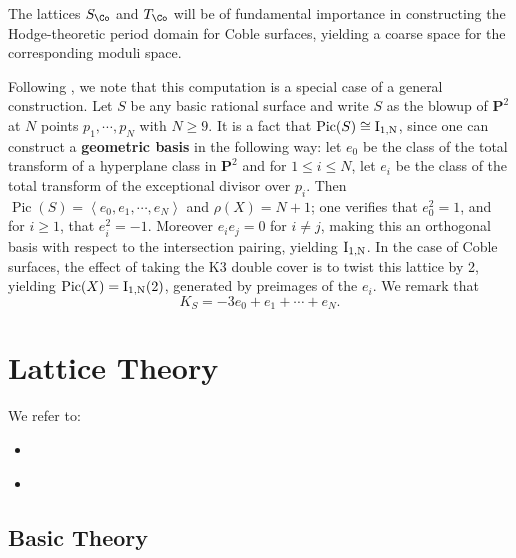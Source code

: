 \documentclass{amsart}
\providecommand{\tightlist}{%
  \setlength{\itemsep}{0pt}\setlength{\parskip}{0pt}}
\begin{document}
\begin{remark}
The lattices \(S_{\Co}\) and \(T_{\Co}\) will be of fundamental importance in constructing the Hodge-theoretic period domain for Coble surfaces, yielding a coarse space for the corresponding moduli space.

\end{remark}

\begin{remark}

Following \cite{CD12}, we note that this computation is a special case of a general construction. Let \(S\) be any basic rational surface and write \(S\) as the blowup of \({\mathbf{P}}^2\) at \(N\) points \(p_1,\cdots, p_N\) with \(N\geq 9\). It is a fact that \(\operatorname{Pic}(S) \cong \rm{I}_{1, N}\), since one can construct a \textbf{geometric basis} in the following way: let \(e_0\) be the class of the total transform of a hyperplane class in \({\mathbf{P}}^2\) and for \(1\leq i\leq N\), let \(e_i\) be the class of the total transform of the exceptional divisor over \(p_i\). Then \(\operatorname{Pic}(S) = \left\langle{e_0,e_1,\cdots, e_N}\right\rangle\) and \(\rho(X) = N+1\); one verifies that \(e_0^2 = 1\), and for \(i\geq 1\), that \(e_i^2 = -1\). Moreover \(e_ie_j = 0\) for \(i\neq j\), making this an orthogonal basis with respect to the intersection pairing, yielding \(\rm{I}_{1, N}\). In the case of Coble surfaces, the effect of taking the K3 double cover is to twist this lattice by 2, yielding \(\operatorname{Pic}(X) = \rm{I}_{1, N}(2)\), generated by preimages of the \(e_i\). We remark that \[
K_S = -3e_0 + e_1 + \cdots + e_N
.\]

\end{remark}

\section{Lattice Theory}\label{lattice-theory}

\begin{remark}

We refer to:

\begin{itemize}
\tightlist
\item
  \cite{vinberg1985hyperbolic-groups}
\item
  \cite{Vin75}
\end{itemize}

\end{remark}

\subsection{Basic Theory}\label{basic-theory}
\end{document}
